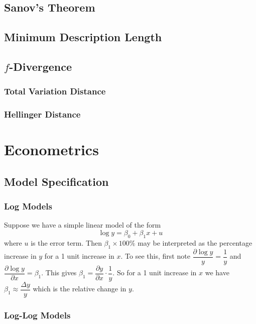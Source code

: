 \documentclass[11pt]{report} %
\begin{document}
\section{Sanov's Theorem}

\section{Minimum Description Length}

\section{$f$-Divergence}

\subsection{Total Variation Distance}

\subsection{Hellinger Distance}

\chapter{Econometrics}

\section{Model Specification}

\subsection{Log Models}

Suppose we have a simple linear model of the form
\begin{equation}
\log y = \beta_{0} + \beta_{1}x + u
\end{equation}
where $u$ is the error term. Then $\beta_{1}\times 100\%$ may be interpreted as the percentage increase in $y$ for a 1 unit increase in $x$. To see this, first note $\dfrac{\partial \log y}{y} = \dfrac{1}{y}$ and $\dfrac{\partial \log y}{\partial x} = \beta_{1}$. This gives $\beta_{1} = \dfrac{\partial y}{\partial x}\cdot\dfrac{1}{y}$. So for a 1 unit increase in $x$ we have $\beta_{1} \approx \dfrac{\Delta y}{y}$ which is the relative change in $y$.

\subsection{Log-Log Models}
\end{document}
